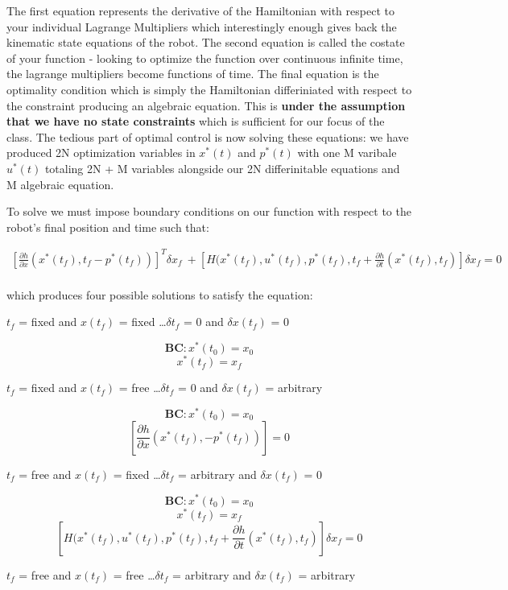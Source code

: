 \documentclass[twoside]{article}
\begin{document}
The first equation represents the derivative of the Hamiltonian with respect to your individual Lagrange Multipliers which interestingly enough gives back the kinematic state equations of the robot. The second equation is called the costate of your function - looking to optimize the function over continuous infinite time, the lagrange multipliers become functions of time. The final equation is the optimality condition which is simply the Hamiltonian differiniated with respect to the constraint producing an algebraic equation. This is \textbf{under the assumption that we have no state constraints} which is sufficient for our focus of the class. The tedious part of optimal control is now solving these equations: we have produced 2N optimization variables in $x^*(t)$ and $p^*(t)$ with one M varibale $u^*(t)$ totaling 2N + M variables alongside our 2N differinitable equations and M algebraic equation.

To solve we must impose boundary conditions on our function with respect to the robot's final position and time such that:

\begin{equation} \label{hamiltonianBCs}
\begin{split}
[\frac{\partial{h}}{\partial{x}}(x^*(t_f), t_f - p^*(t_f))]^T\delta{x_f}\ + [H(x^*(t_f), u^*(t_f), p^*(t_f), t_f + \frac{\partial{h}}{\partial{t}}(x^*(t_f), t_f)]\delta{x_f} = 0\\
\end{split}
\end{equation}

which produces four possible solutions to satisfy the equation:

$t_f$ = fixed and $x(t_f)$ = fixed \dots $\delta{t_f}$ = 0 and $\delta{x(t_f)}$ = 0

$$\textbf{BC}: x^*(t_0) = x_0$$
$$x^*(t_f) = x_f$$


$t_f$ = fixed and $x(t_f)$ = free \dots $\delta{t_f}$ = 0 and $\delta{x(t_f)}$ = arbitrary

$$\textbf{BC}: x^*(t_0) = x_0$$
$$[\frac{\partial{h}}{\partial{x}}(x^*(t_f), - p^*(t_f))] = 0$$


$t_f$ = free and $x(t_f)$ = fixed \dots $\delta{t_f}$ = arbitrary and $\delta{x(t_f)}$ = 0

$$\textbf{BC}: x^*(t_0) = x_0$$
$$x^*(t_f) = x_f$$
$$[H(x^*(t_f), u^*(t_f), p^*(t_f), t_f + \frac{\partial{h}}{\partial{t}}(x^*(t_f), t_f)]\delta{x_f} = 0$$



$t_f$ = free and $x(t_f)$ = free \dots $\delta{t_f}$ = arbitrary and $\delta{x(t_f)}$ = arbitrary
\end{document}
